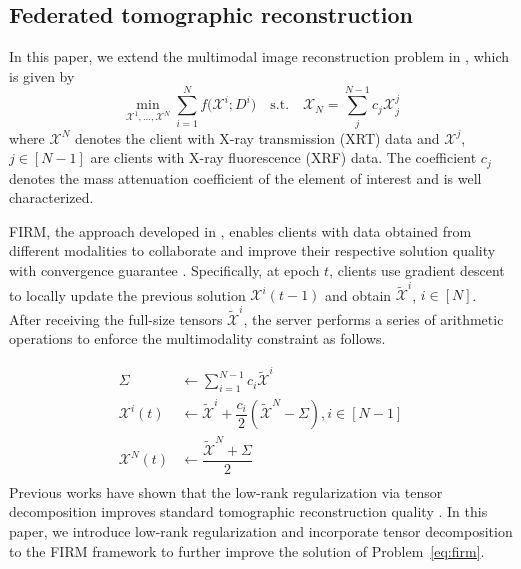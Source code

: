 \subsection{Federated tomographic reconstruction}
In this paper, we extend the multimodal image reconstruction problem in \cite{byeon2025firmfederatedimagereconstruction}, which is given by
\begin{equation}\label{eq:firm}
    \min_{\boldsymbol{\mathcal{X}}^1, ..., \boldsymbol{\mathcal{X}}^N} \sum_{i=1}^N f\big(\boldsymbol{\mathcal{X}}^i; \mathit{D}^i\big) \quad
    \text{s.t.} \quad \boldsymbol{\mathcal{X}}_{N} = \sum_j^{N-1} c_j \boldsymbol{\mathcal{X}}^j_{j}
\end{equation}
where $\boldsymbol{\mathcal{X}}^N$ denotes the client with X-ray transmission (XRT) data and $\boldsymbol{\mathcal{X}}^j$, $j\in[N-1]$ are clients with X-ray fluorescence (XRF) data. The coefficient $c_j$ denotes the mass attenuation coefficient of the element of interest and is well characterized.

FIRM, the approach developed in \cite{byeon2025firmfederatedimagereconstruction}, enables clients with data obtained from different modalities to collaborate and improve their respective solution quality with convergence guarantee \cite{byeon2025firmfederatedimagereconstruction}. Specifically, at epoch $t$, clients use gradient descent to locally update the previous solution $\boldsymbol{\mathcal{X}}^i(t-1)$ and obtain $\tilde{\boldsymbol{\mathcal{X}}}^i$, $i\in[N]$. After receiving the full-size tensors $\tilde{\boldsymbol{\mathcal{X}}}^i$, the server performs a series of arithmetic operations to enforce the multimodality constraint as follows.

\begin{equation}\label{eq:firm_update}
\begin{aligned}
    \Sigma &\leftarrow \sum_{i=1}^{N-1} c_i\tilde{\boldsymbol{\mathcal{X}}}^i\\
    \boldsymbol{\mathcal{X}}^i(t) &\leftarrow \tilde{\boldsymbol{\mathcal{X}}}^i + \dfrac{c_i}{2}(\tilde{\boldsymbol{\mathcal{X}}}^N - \Sigma), i\in[N-1]\\ 
    \boldsymbol{\mathcal{X}}^N(t) &\leftarrow \dfrac{\tilde{\boldsymbol{\mathcal{X}}}^N + \Sigma}{2}\\
\end{aligned}
\end{equation}
Previous works have shown that the low-rank regularization via tensor decomposition improves standard tomographic reconstruction quality \cite{jantre2021low}. In this paper, we introduce low-rank regularization and incorporate tensor decomposition to the FIRM framework to further improve the solution of Problem~\ref{eq:firm}.